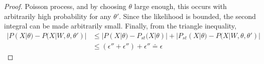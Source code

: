 \begin{proof}
Poisson process, and by choosing $\theta$ large enough, this occurs
with arbitrarily high probability for any $\theta'$. Since the likelihood is bounded, the
second integral can be made arbitrarily small. Finally, from the triangle
inequality,
\begin{align*}
|P(X | \theta) - P(X | W, \theta, \theta')| &\leq |P(X | \theta) -P_{st}(X | \theta) | + | P_{st}(X | \theta) -  P(X | W, \theta, \theta')|\\
       & \leq (\epsilon'' + \epsilon'') + \epsilon'' \doteq \epsilon
\end{align*}

\end{proof}


